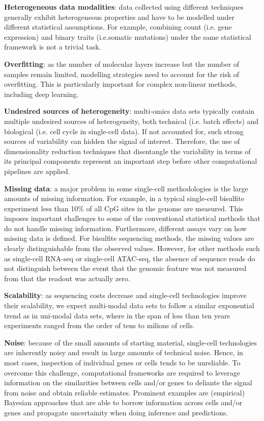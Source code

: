 \begin{itemize}
	\textbf{Heterogeneous data modalities}: data collected using different techniques generally exhibit heterogeneous properties and have to be modelled under different statistical assumptions. For example, combining count (i.e. gene expression) and binary traits (i.e.somatic mutations) under the same statistical framework is not a trivial task. 

	\textbf{Overfitting}: as the number of molecular layers increase but the number of samples remain limited, modelling strategies need to account for the risk of overfitting. This is particularly important for complex non-linear methods, including deep learning.

	\textbf{Undesired sources of heterogeneity}: multi-omics data sets typically contain multiple undesired sources of heterogeneity, both technical (i.e. batch effects) and biological (i.e. cell cycle in single-cell data). If not accounted for, such strong sources of variability can hidden the signal of interest. Therefore, the use of dimensionality reduction techniques that disentangle the variability in terms of its principal components  represent an important step before other computational pipelines are applied.

	\textbf{Missing data}: a major problem in some single-cell methodologies is the large amounts of missing information. For example, in a typical single-cell bisulfite experiment less than 10\% of all CpG sites in the genome are measured. This imposes important challenges to some of the conventional statistical methods that do not handle missing information. Furthermore, different assays vary on how missing data is defined. For bisulfite sequencing methods, the missing values are clearly distinguishable from the observed values. However, for other methods such as single-cell RNA-seq or single-cell ATAC-seq, the absence of sequence reads do not distinguish between the event that the genomic feature was not measured from that the readout was actually zero.

	\textbf{Scalability}: as sequencing costs decrease and single-cell technologies improve their scalability, we expect multi-modal data sets to follow a similar exponential trend as in uni-modal data sets, where in the span of less than ten years experiments ranged from the order of tens to milions of cells.

	\textbf{Noise}: because of the small amounts of starting material, single-cell technologies are inherently noisy and result in large amounts of technical noise. Hence, in most cases, inspection of individual genes or cells tends to be unreliable. To overcome this challenge, computational frameworks are required to leverage information on the similarities between cells and/or genes to deliante the signal from noise and obtain reliable estimates. Prominent examples are (empirical) Bayesian approaches that are able to borrow information across cells and/or genes and propagate uncertainity when doing inference and predictions.


\end{itemize}
